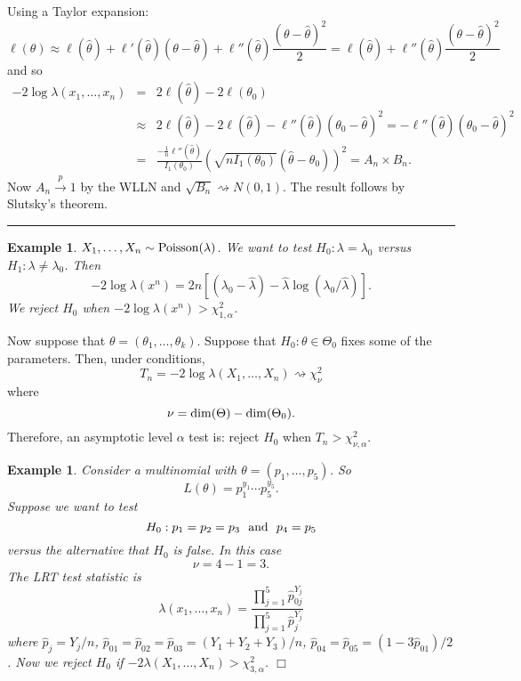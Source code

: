 \documentclass[twoside,12pt]{article}
\newtheorem{example}[theorem]{Example}
\newenvironment{proof}{{\bf Proof:}}{\hfill\rule{2mm}{2mm}}
\newcommand{\cprob}{\overset{p}{\rightarrow}}
\begin{document}
\begin{proof}
Using a Taylor expansion:
$$
\ell(\theta) \approx \ell(\widehat\theta) + \ell'(\widehat\theta)(\theta-\widehat\theta) + 
\ell''(\widehat\theta) \frac{(\theta-\widehat\theta)^2}{2} =
\ell(\widehat\theta) +  \ell''(\widehat\theta) \frac{(\theta-\widehat\theta)^2}{2}
$$
and so
\begin{eqnarray*}
-2\log \lambda(x_1,\ldots, x_n) &=& 2\ell(\widehat\theta) - 2\ell(\theta_0)\\
& \approx &
2\ell(\widehat\theta)
-2\ell(\widehat\theta) -  \ell''(\widehat\theta) (\theta_0-\widehat\theta)^2 =
-  \ell''(\widehat\theta) (\theta_0-\widehat\theta)^2 \\
&=&
\frac{-\frac{1}{n} \ell''(\widehat\theta)}{I_1(\theta_0)}
 (\sqrt{n I_1(\theta_0)}(\widehat\theta-\theta_0))^2 = A_n \times B_n.
\end{eqnarray*}
Now $A_n\cprob 1$ by the WLLN and
$\sqrt{B_n}\rightsquigarrow N(0,1)$.
The result follows by Slutsky's theorem.
\end{proof}

\begin{example}
$X_1,\ldots, X_n \sim {\rm Poisson}(\lambda)$.
We want to test
$H_0:\lambda = \lambda_0$ versus
$H_1:\lambda \neq \lambda_0$.
Then
$$
-2\log \lambda(x^n) = 2n[(\lambda_0 - \widehat\lambda) - \widehat\lambda \log(\lambda_0/\widehat\lambda)].
$$
We reject $H_0$ when
$-2\log \lambda(x^n) > \chi^2_{1,\alpha}$.
\end{example}

Now suppose that
$\theta=(\theta_1,\ldots, \theta_k)$.
Suppose that $H_0: \theta\in\Theta_0$ fixes some of the parameters.
Then, under conditions,
$$
T_n = -2\log \lambda(X_1,\ldots, X_n) \rightsquigarrow \chi^2_{\nu}
$$
where
$$
\nu = {\rm dim}(\Theta) - {\rm dim}(\Theta_0).
$$
Therefore,
an asymptotic level $\alpha$ test is: reject $H_0$ when
$T_n > \chi^2_{\nu,\alpha}$.


\begin{example}
Consider a multinomial with
$\theta = (p_1,\ldots, p_5)$.
So
$$
L(\theta) = p_1^{y_1}\cdots p_5^{y_5}.
$$
Suppose we want to test
$$
H_0: p_1=p_2=p_3 \ \ {\rm and}\ \ p_4 = p_5
$$
versus the alternative that $H_0$ is false.
In this case
$$
\nu = 4 - 1 = 3.
$$
The LRT test statistic is
$$
\lambda(x_1,\ldots, x_n) =
\frac{ \prod_{j=1}^5 \widehat{p}_{0j}^{Y_j}}{ \prod_{j=1}^5 \widehat{p}_{j}^{Y_j}}
$$
where
$\widehat{p}_j = Y_j/n$,
$\widehat{p}_{01} = \widehat{p}_{02} = \widehat{p}_{03}  = (Y_1+Y_2+Y_3)/n$,
$\widehat{p}_{04} = \widehat{p}_{05} = (1-3\widehat{p}_{01})/2$.
Now we reject $H_0$ if
$-2\lambda (X_1,\ldots, X_n) > \chi^2_{3,\alpha}$. $\Box$
\end{example}
\end{document}
